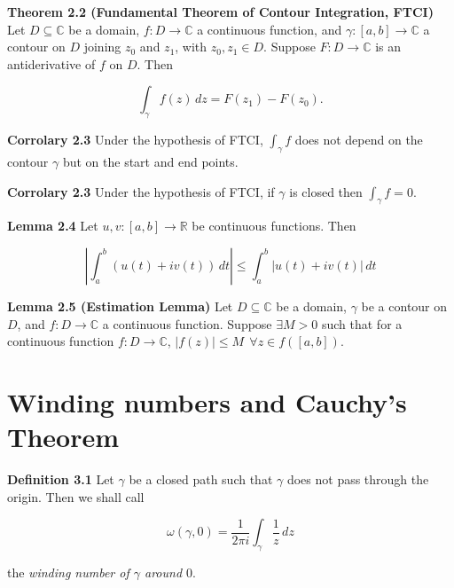 \documentclass{article}
\begin{document}
\bigskip

\textbf{Theorem 2.2 (Fundamental Theorem of Contour Integration, FTCI)} Let $D \subseteq \mathbb{C}$ be a domain, $f: D \rightarrow \mathbb{C}$ a continuous function, and $\gamma:[a,b] \rightarrow \mathbb{C}$ a contour on $D$ joining $z_0$ and $z_1$, with $z_0, z_1 \in D$. Suppose $F: D \rightarrow \mathbb{C}$ is an antiderivative of $f$ on $D$. Then 

\begin{equation}
    \int_{\gamma} f(z) \, dz = F(z_1) - F(z_0).
\end{equation}

\bigskip

\textbf{Corrolary 2.3} Under the hypothesis of FTCI, $\int_{\gamma} f$ does not depend on the contour $\gamma$ but on the start and end points. 

\bigskip

\textbf{Corrolary 2.3} Under the hypothesis of FTCI, if $\gamma$ is closed then $\int_{\gamma} f = 0.$

\bigskip

\textbf{Lemma 2.4} Let $u, v:[a,b] \rightarrow \mathbb{R}$ be continuous functions. Then 

\begin{equation}
    |\int_{a}^{b} (u(t) + iv(t)) \, dt| \leq \int_{a}^{b} |u(t) + iv(t)| \, dt
\end{equation}

\textbf{Lemma 2.5 (Estimation Lemma)} Let $D \subseteq \mathbb{C}$ be a domain, $\gamma$ be a contour on $D$, and $f:D \rightarrow \mathbb{C}$ a continuous function. Suppose $\exists M > 0$ such that for a continuous function $f:D \rightarrow \mathbb{C}$, $|f(z)|\leq M \ \ \forall z \in f([a,b]).$ 

\bigskip

\section{Winding numbers and Cauchy's Theorem}
\textbf{Definition 3.1} Let $\gamma$ be a closed path such that $\gamma$ does not pass through the origin. Then we shall call 

\begin{equation}
    \omega(\gamma, 0) = \frac{1}{2 \pi i} \int_{\gamma} \frac{1}{z} \, dz
\end{equation}

the {\it{winding number of $\gamma$ around $0.$}}

\bigskip
\end{document}
